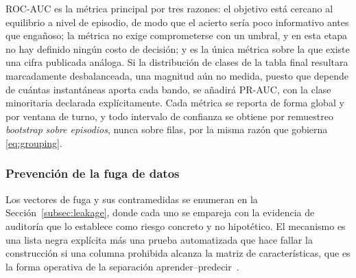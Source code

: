 \documentclass[conference]{IEEEtran}
\begin{document}
ROC-AUC es la m\'etrica principal por tres razones: el objetivo est\'a
cercano al equilibrio a nivel de episodio, de modo que el acierto ser\'ia
poco informativo antes que enga\~noso; la m\'etrica no exige comprometerse
con un umbral, y en esta etapa no hay definido ning\'un costo de decisi\'on;
y es la \'unica m\'etrica sobre la que existe una cifra publicada
an\'aloga. Si la distribuci\'on de clases de la tabla final resultara
marcadamente desbalanceada, una magnitud a\'un no medida, puesto que
depende de cu\'antas instant\'aneas aporta cada bando, se a\~nadir\'a
PR-AUC, con la clase minoritaria declarada expl\'icitamente. Cada m\'etrica
se reporta de forma global y por ventana de turno, y todo intervalo de
confianza se obtiene por remuestreo \emph{bootstrap} \emph{sobre
episodios}, nunca sobre filas, por la misma raz\'on que gobierna
\eqref{eq:grouping}.

\subsubsection{Prevenci\'on de la fuga de datos}
Los vectores de fuga y sus contramedidas se enumeran en la
Secci\'on~\ref{subsec:leakage}, donde cada uno se empareja con la evidencia
de auditor\'ia que lo establece como riesgo concreto y no hipot\'etico. El
mecanismo es una lista negra expl\'icita m\'as una prueba automatizada que
hace fallar la construcci\'on si una columna prohibida alcanza la matriz de
caracter\'isticas, que es la forma operativa de la separaci\'on
aprender--predecir~\cite{kaufman_leakage_2011}.
\end{document}
